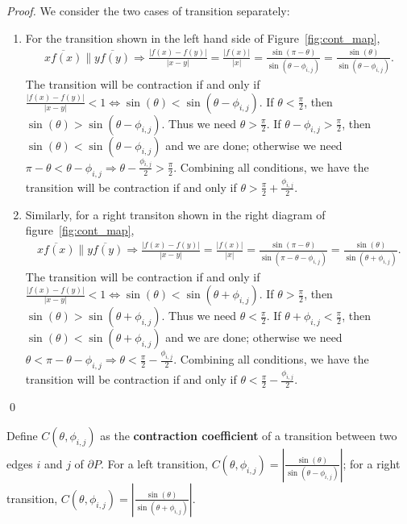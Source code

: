 \documentclass[]{styles/svproc}  %
\begin{document}
\begin{proof}
We consider the two cases of transition separately:
\begin{enumerate}
    \item For the transition shown in the left hand side of Figure~\ref{fig:cont_map}, 
          \begin{eqnarray*}\overline{xf(x)} \parallel \overline{yf(y)} \Rightarrow \frac{|f(x)-f(y)|}{|x-y|} = \frac{|f(x)|}{|x|} = \frac{\sin(\pi - \theta)}{\sin(\theta - \phi_{i, j})} = \frac{\sin(\theta)}{\sin(\theta-\phi_{i, j})}.\end{eqnarray*} The transition will be contraction if and only if $\frac{|f(x)-f(y)|}{|x-y|} < 1 \iff \sin(\theta)<\sin(\theta-\phi_{i, j})$. If $\theta < \frac{\pi}{2}$, then $\sin(\theta) > \sin(\theta-\phi_{i, j})$. Thus we need $\theta>\frac{\pi}{2}$. If $\theta-\phi_{i, j} > \frac{\pi}{2}$, then $\sin(\theta) < \sin(\theta-\phi_{i, j})$ and we are done; otherwise we need $\pi - \theta < \theta-\phi_{i, j} \Rightarrow \theta - \frac{\phi_{i, j}}{2} > \frac{\pi}{2}$. Combining all conditions, we have the transition will be contraction if and only if $\theta >\frac{\pi}{2} + \frac{\phi_{i, j}}{2}$.
    \item Similarly, for a right transiton shown in the right diagram of figure~\ref{fig:cont_map}, \begin{eqnarray*}\overline{xf(x)} \parallel \overline{yf(y)} \Rightarrow \frac{|f(x)-f(y)|}{|x-y|} = \frac{|f(x)|}{|x|} = \frac{\sin(\pi - \theta)}{\sin(\pi -\theta-\phi_{i, j})} = \frac{\sin(\theta)}{\sin(\theta + \phi_{i, j})}.\end{eqnarray*} The transition will be contraction if and only if $\frac{|f(x)-f(y)|}{|x-y|} < 1 \iff \sin(\theta)<\sin(\theta+\phi_{i, j})$. If $\theta  > \frac{\pi}{2}$, then $\sin(\theta) > \sin(\theta + \phi_{i, j})$. Thus we need $\theta<\frac{\pi}{2}$. If $\theta+\phi_{i, j} < \frac{\pi}{2}$, then $\sin(\theta) < \sin(\theta+\phi_{i, j})$ and we are done; otherwise we need $\theta < \pi-\theta-\phi_{i, j} \Rightarrow \theta < \frac{\pi}{2} - \frac{\phi_{i, j}}{2}$. Combining all conditions, we have the transition will be contraction if and only if $\theta <\frac{\pi}{2} - \frac{\phi_{i, j}}{2}$.
\end{enumerate}
\qed

\end{proof}


\begin{definition}
Define $C(\theta, \phi_{i, j})$ as the \textbf{contraction coefficient} of a transition between two
edges $i$ and $j$ of $\partial P$. For a left transition, $C(\theta, \phi_{i, j}) = | \frac{\sin(\theta)}{\sin(\theta - \phi_{i, j})} |$; for a right transition,  $C(\theta, \phi_{i, j}) = | \frac{\sin(\theta)}{\sin(\theta + \phi_{i, j})} |$.
\end{definition}
\end{document}
